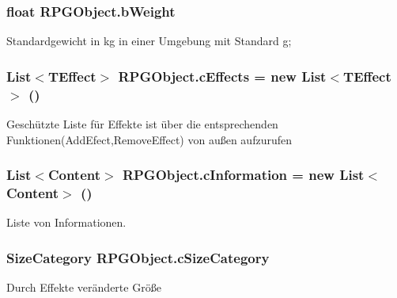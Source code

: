\subsubsection[{b\+Weight}]{\setlength{\rightskip}{0pt plus 5cm}float R\+P\+G\+Object.\+b\+Weight\hspace{0.3cm}{\ttfamily [protected]}}\label{class_r_p_g_object_a550507f127d2915aa0b7a95ef5e3feb6}
Standardgewicht in kg in einer Umgebung mit Standard g; \hypertarget{class_r_p_g_object_a833cf33788a1040a7fdcb703d6e3126d}{}
\subsubsection[{c\+Effects}]{\setlength{\rightskip}{0pt plus 5cm}List$<${\bf T\+Effect}$>$ R\+P\+G\+Object.\+c\+Effects = new List$<${\bf T\+Effect}$>$ ()\hspace{0.3cm}{\ttfamily [protected]}}\label{class_r_p_g_object_a833cf33788a1040a7fdcb703d6e3126d}
Geschützte Liste für Effekte ist über die entsprechenden Funktionen(\+Add\+Efect,\+Remove\+Effect) von außen aufzurufen \hypertarget{class_r_p_g_object_ac5b133eca19e8f97988722018cdf139b}{}
\subsubsection[{c\+Information}]{\setlength{\rightskip}{0pt plus 5cm}List$<${\bf Content}$>$ R\+P\+G\+Object.\+c\+Information = new List$<${\bf Content}$>$ ()\hspace{0.3cm}{\ttfamily [protected]}}\label{class_r_p_g_object_ac5b133eca19e8f97988722018cdf139b}
Liste von Informationen. \hypertarget{class_r_p_g_object_a5076aeba98770e8507778eb6051df87b}{}
\subsubsection[{c\+Size\+Category}]{\setlength{\rightskip}{0pt plus 5cm}Size\+Category R\+P\+G\+Object.\+c\+Size\+Category\hspace{0.3cm}{\ttfamily [protected]}}\label{class_r_p_g_object_a5076aeba98770e8507778eb6051df87b}
Durch Effekte veränderte Größe \hypertarget{class_r_p_g_object_a098dcfa4772557888348f5164da509f8}{}
